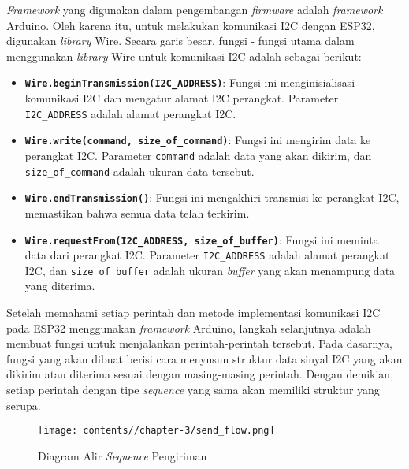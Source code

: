         \textit{Framework} yang digunakan dalam pengembangan \textit{firmware} adalah \textit{framework} Arduino. Oleh karena itu, untuk melakukan komunikasi I2C dengan ESP32, digunakan \textit{library} Wire. Secara garis besar, fungsi - fungsi utama dalam menggunakan \textit{library} Wire untuk komunikasi I2C adalah sebagai berikut:

        \begin{itemize}
            \item \textbf{\texttt{Wire.beginTransmission(I2C\_ADDRESS)}}: Fungsi ini menginisialisasi komunikasi I2C dan mengatur alamat I2C perangkat. Parameter \texttt{I2C\_ADDRESS} adalah alamat perangkat I2C.
            
            \item \textbf{\texttt{Wire.write(command, size\_of\_command)}}: Fungsi ini mengirim data ke perangkat I2C. Parameter \texttt{command} adalah data yang akan dikirim, dan \texttt{size\_of\_command} adalah ukuran data tersebut.
            
            \item \textbf{\texttt{Wire.endTransmission()}}: Fungsi ini mengakhiri transmisi ke perangkat I2C, memastikan bahwa semua data telah terkirim.
            
            \item \textbf{\texttt{Wire.requestFrom(I2C\_ADDRESS, size\_of\_buffer)}}: Fungsi ini meminta data dari perangkat I2C. Parameter \texttt{I2C\_ADDRESS} adalah alamat perangkat I2C, dan \texttt{size\_of\_buffer} adalah ukuran \textit{buffer} yang akan menampung data yang diterima.
        \end{itemize}
    
        Setelah memahami setiap perintah dan metode implementasi komunikasi I2C pada ESP32 menggunakan \textit{framework} Arduino, langkah selanjutnya adalah membuat fungsi untuk menjalankan perintah-perintah tersebut. Pada dasarnya, fungsi yang akan dibuat berisi cara menyusun struktur data sinyal I2C yang akan dikirim atau diterima sesuai dengan masing-masing perintah. Dengan demikian, setiap perintah dengan tipe \textit{sequence}  yang sama akan memiliki struktur yang serupa.

        \begin{figure}[H]
            \centering
            \texttt{[image: contents//chapter-3/send\_flow.png]}
            \caption{Diagram Alir \textit{Sequence} Pengiriman}
            \label{fig:send_flow}
        \end{figure}
        
